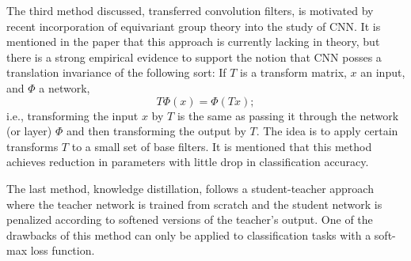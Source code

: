 The third method discussed, transferred convolution filters, is motivated by
recent incorporation of equivariant group theory into the study of CNN. It is
mentioned in the paper that this approach is currently lacking in theory, but
there is a strong empirical evidence to support the notion that CNN posses a
translation invariance of the following sort: If $T$ is a transform matrix, $x$
an input, and $\Phi$ a network,
\begin{equation}\label{sum-1:eqv-gp-th}
  T\Phi(x)=\Phi(Tx);
\end{equation}
i.e., transforming the input $x$ by $T$ is the same as passing it through the
network (or layer) $\Phi$ and then transforming the output by $T$. The idea is
to apply certain transforms $T$ to a small set of base filters. It is mentioned
that this method achieves reduction in parameters with little drop in
classification accuracy.

The last method, knowledge distillation, follows a student-teacher approach
where the teacher network is trained from scratch and the student network is
penalized according to softened versions of the teacher's output. One of the
drawbacks of this method can only be applied to classification tasks with a
soft-max loss function.


